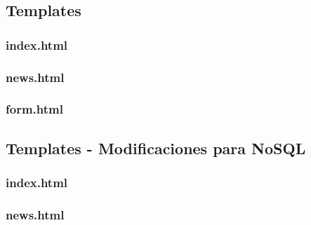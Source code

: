\documentclass[a4paper,oneside]{article}
\begin{document}
\subsection{Templates}

\subsubsection{index.html}


\subsubsection{news.html}


\subsubsection{form.html}


\subsection{Templates - Modificaciones para NoSQL}
\label{ann:nosql_mods}
\subsubsection{index.html}


\subsubsection{news.html}

\end{document}

